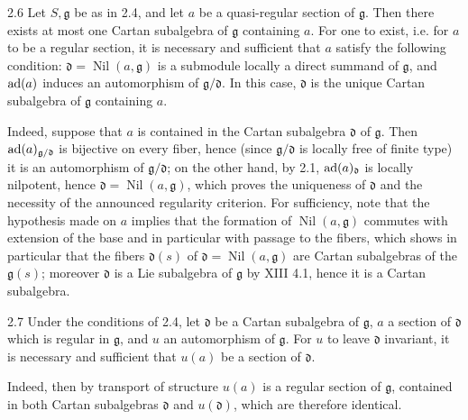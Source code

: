 \begin{proposition}{2.6}\label{XIV.2.6}
Let $S,\mathfrak g$ be as in 2.4, and let $a$ be a quasi-regular
section of $\mathfrak g$. Then there exists at most one Cartan
subalgebra of $\mathfrak g$ containing $a$. For one to exist,
i.e. for $a$ to be a regular section, it is necessary and
sufficient that $a$ satisfy the following condition:
$\mathfrak d=\operatorname{Nil}(a,\mathfrak g)$ is a submodule
locally a direct summand of $\mathfrak g$, and $\operatorname{ad}(a)$ induces
an automorphism of $\mathfrak g/\mathfrak d$. In this case,
$\mathfrak d$ is the unique Cartan subalgebra of $\mathfrak g$
containing $a$.
\end{proposition}
Indeed, suppose that $a$ is contained in the Cartan subalgebra
$\mathfrak d$ of $\mathfrak g$. Then
$\operatorname{ad}(a)_{\mathfrak g/\mathfrak d}$ is bijective on every fiber,
hence (since $\mathfrak g/\mathfrak d$ is locally free of finite
type) it is an automorphism of $\mathfrak g/\mathfrak d$; on
the other hand, by 2.1, $\operatorname{ad}(a)_{\mathfrak d}$ is locally
nilpotent, hence $\mathfrak d=\operatorname{Nil}(a,\mathfrak g)$,
which proves the uniqueness of $\mathfrak d$ and the necessity
of the announced regularity criterion. For sufficiency, note
that the hypothesis made on $a$ implies that the formation
of $\operatorname{Nil}(a,\mathfrak g)$ commutes with extension
of the base and in particular with passage to the fibers,
which shows in particular that the fibers $\mathfrak d(s)$
of $\mathfrak d=\operatorname{Nil}(a,\mathfrak g)$ are Cartan
subalgebras of the $\mathfrak g(s)$; moreover $\mathfrak d$
is a Lie subalgebra of $\mathfrak g$ by XIII 4.1, hence it
is a Cartan subalgebra.

\begin{corollary}{2.7}\label{XIV.2.7}
Under the conditions of 2.4, let $\mathfrak d$ be a Cartan
subalgebra of $\mathfrak g$, $a$ a section of $\mathfrak d$
which is regular in $\mathfrak g$, and $u$ an automorphism
of $\mathfrak g$. For $u$ to leave $\mathfrak d$ invariant,
it is necessary and sufficient that $u(a)$ be a section
of $\mathfrak d$.
\end{corollary}
Indeed, then by transport of structure $u(a)$ is a regular
section of $\mathfrak g$, contained in both Cartan subalgebras
$\mathfrak d$ and $u(\mathfrak d)$, which are therefore identical.

